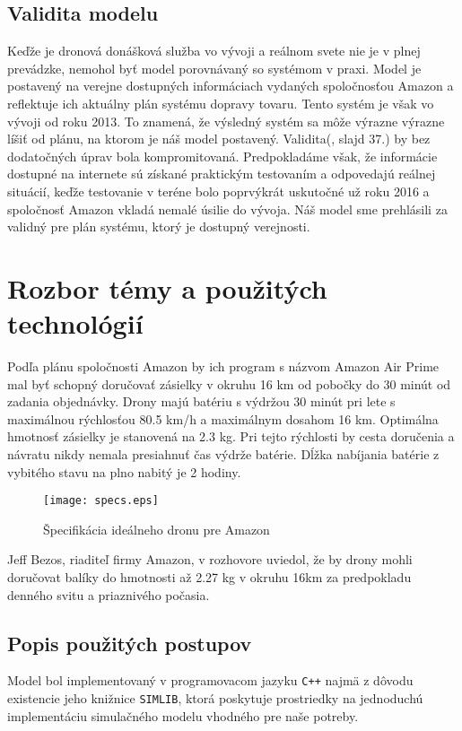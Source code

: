 \documentclass[czech, 12pt, a4paper]{article}
\begin{document}
\subsection{Validita modelu}
Keďže je dronová donášková služba vo vývoji a reálnom svete nie je v plnej prevádzke, nemohol byť model porovnávaný so systémom v praxi. Model je postavený na verejne dostupných informáciach vydaných spoločnosťou Amazon a reflektuje ich aktuálny plán systému dopravy tovaru. Tento systém je však vo vývoji od roku 2013\cite{amazonPrime}. To znamená, že výsledný systém sa môže výrazne výrazne líšiť od plánu, na ktorom je náš model postavený. Validita(\cite{prednasky}, slajd 37.) by bez dodatočných úprav bola kompromitovaná. Predpokladáme však, že informácie dostupné na internete sú získané praktickým testovaním a odpovedajú reálnej situácií, keďže testovanie v teréne bolo poprvýkrát uskutočné už roku 2016\cite{amazonPrime} a spoločnosť Amazon vkladá nemalé úsilie do vývoja\cite{businessInsider}. Náš model sme prehlásili za validný pre plán systému, ktorý je dostupný verejnosti.

\newpage
\section{Rozbor témy a použitých technológií}
Podľa plánu spoločnosti Amazon by ich program s názvom Amazon Air Prime mal byť schopný doručovať zásielky v okruhu 16 km od pobočky do 30 minút od zadania objednávky. Drony majú batériu s výdržou 30 minút pri lete s maximálnou rýchlosťou 80.5 km/h a maximálnym dosahom 16 km. Optimálna hmotnosť zásielky je stanovená na 2.3 kg\cite{specsRef}. Pri tejto rýchlosti by cesta doručenia a návratu nikdy nemala presiahnuť čas výdrže batérie. Dĺžka nabíjania batérie z vybitého stavu na plno nabitý je 2 hodiny.\cite{batterySpecsRef}

\begin{figure}[h!]
	\begin{centering}
	\texttt{[image: specs.eps]}
	\caption{Špecifikácia ideálneho dronu pre Amazon\cite{specsRef}}
	\label{specs}
	\end{centering}
\end{figure}

Jeff Bezos, riaditeľ firmy Amazon, v rozhovore uviedol, že by drony mohli doručovat balíky do hmotnosti až 2.27 kg v okruhu 16km za predpokladu denného svitu a priaznivého počasia.\cite{guardianRef}


\subsection{Popis použitých postupov}
Model bol implementovaný v programovacom jazyku \texttt{C++} najmä z dôvodu existencie jeho knižnice \texttt{SIMLIB}, ktorá poskytuje prostriedky na jednoduchú implementáciu simulačného modelu vhodného pre naše potreby.
\end{document}

